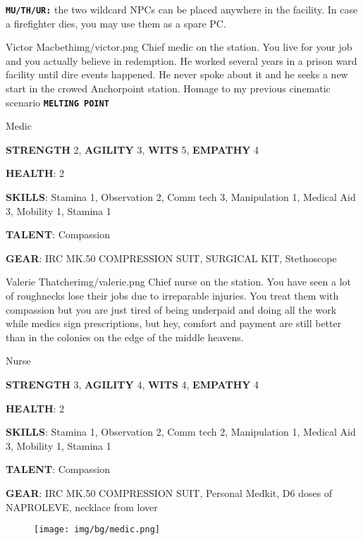 \clearpage

\begin{rpg-commentbox}{}
    \texttt{\textbf{MU/TH/UR:}} the two wildcard NPCs can be placed anywhere in the facility. In case a firefighter dies, you may use them as a spare PC.
\end{rpg-commentbox}

\begin{rpg-pcbox}{Victor Macbeth}{img/victor.png}    
    Chief medic on the station. You live for your job and you actually believe in redemption. He worked several years in a prison ward facility until dire events happened. He never spoke about it and he seeks a new start in the crowed Anchorpoint station. Homage to my previous cinematic scenario \texttt{\textbf{MELTING POINT}} 
\end{rpg-pcbox}

\begin{rpg-commentbox}{}
    Medic

    \textbf{STRENGTH} 2, \textbf{AGILITY} 3, \textbf{WITS} 5, \textbf{EMPATHY} 4

    \textbf{HEALTH}: 2

    \textbf{SKILLS}: Stamina 1, Observation 2, Comm tech 3, Manipulation 1, Medical Aid 3, Mobility 1, Stamina 1
    
    \textbf{TALENT}: Compassion
    
    \textbf{GEAR}: IRC MK.50 COMPRESSION SUIT, SURGICAL KIT, Stethoscope
\end{rpg-commentbox}

\newsect

\begin{rpg-pcbox}{Valerie Thatcher}{img/valerie.png}    
    Chief nurse on the station. You have seen a lot of roughnecks lose their jobs due to irreparable injuries. You treat them with compassion but you are just tired of being underpaid and doing all the work while medics sign prescriptions, but hey, comfort and payment are still better than in the colonies on the edge of the middle heavens. 
\end{rpg-pcbox}

\begin{rpg-commentbox}{}
    Nurse

    \textbf{STRENGTH} 3, \textbf{AGILITY} 4, \textbf{WITS} 4, \textbf{EMPATHY} 4

    \textbf{HEALTH}: 2

    \textbf{SKILLS}: Stamina 1, Observation 2, Comm tech 2, Manipulation 1, Medical Aid 3, Mobility 1, Stamina 1
    
    \textbf{TALENT}: Compassion
    
    \textbf{GEAR}: IRC MK.50 COMPRESSION SUIT, Personal Medkit, D6 doses of NAPROLEVE, necklace from lover
\end{rpg-commentbox}




\begin{figure}
    \texttt{[image: img/bg/medic.png]}
    \label{fig:refinery}
\end{figure}